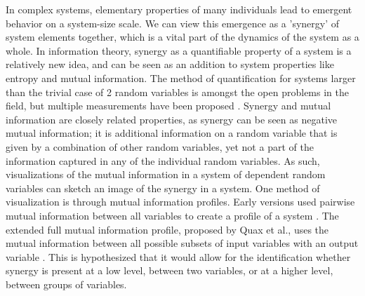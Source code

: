 \documentclass[../main.tex]{subfiles}
\begin{document}
In complex systems, elementary properties of many individuals lead to emergent behavior on a system-size scale.
We can view this emergence as a ’synergy’ of system elements together, which is a vital part of the dynamics of the system as a whole.
In information theory, synergy as a quantifiable property of a system is a relatively new idea, and can be seen as an addition to system properties like entropy and mutual information.
The method of quantification for systems larger than the trivial case of 2 random variables is amongst the open problems in the field, but multiple measurements have been proposed \cite{}.
Synergy and mutual information are closely related properties, as synergy can be seen as negative mutual information; it is additional information on a random variable that is given by a combination of other random variables, yet not a part of the information captured in any of the individual random variables.
As such, visualizations of the mutual information in a system of dependent random variables can sketch an image of the synergy in a system.
One method of visualization is through mutual information profiles.
Early versions used pairwise mutual information between all variables to create a profile of a system \cite{bar2013computationally}. 
The extended full mutual information profile, proposed by Quax et al., uses the mutual information between all possible subsets of input variables with an output variable \cite{quax2017quantifying}.
This is hypothesized that it would allow for the identification whether synergy is present at a low level, between two variables, or at a higher level, between groups of variables.
\end{document}
